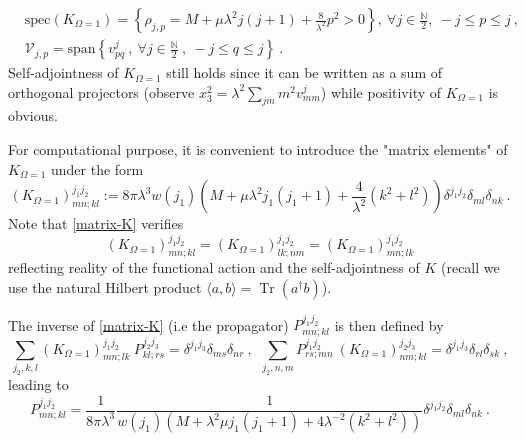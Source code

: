 \documentclass[a4paper,11pt,twoside]{article}
\numberwithin{equation}{section}
\DeclareMathOperator{\tr}{Tr}
\theoremstyle{nonumberplain}
\newcounter{and}
\begin{document}
%
\begin{eqnarray}
&\text{spec}(K_{\Omega=1}) = \left\{ \rho_{j,p} = M + \mu \lambda^2 j(j+1) + \frac{8}{\lambda^2} p^2>0 \right\},\ \forall j \in \frac{\mathbb{N}}{2} , \ -j \le p \le j \ , \label{spec-K}& \\[2pt]
&\mathcal{V}_{j,p} = \text{span}\left\{v^j_{pq} \ , \ \forall j \in \frac{\mathbb{N}}{2} \ , \ -j \le q \le j \right\} \ . \label{eigensp-K}&
\end{eqnarray}
%
Self-adjointness of $K_{\Omega=1}$ still holds since it can be written as a sum of orthogonal projectors (observe $x_3^2 = \lambda^2 \sum_{jm} m^2 v^j_{mm}$) while positivity of $K_{\Omega=1}$ is obvious.\par%
%
For computational purpose, it is convenient to introduce the "matrix elements" of $K_{\Omega=1}$ under the form%
%
\begin{equation}
\left(K_{\Omega=1}\right)^{j_1 j_2}_{mn;kl} := 8\pi\lambda^3 w(j_1) \left( M + \mu \lambda^2 j_1 (j_1+1) + \frac{4}{\lambda^2} (k^2+l^2) \right) \delta^{j_1j_2} \delta_{ml} \delta_{nk} \ . \label{matrix-K} 
\end{equation}
%
Note that \eqref{matrix-K} verifies%
%
\begin{equation}
\left(K_{\Omega=1}\right)^{j_1j_2}_{mn;kl} = \left(K_{\Omega=1}\right)^{j_1j_2}_{lk;nm} = \left(K_{\Omega=1}\right)^{j_1j_2}_{mn;lk} \label{sym-K}
\end{equation}
%
reflecting reality of the functional action and the self-adjointness of $K$ (recall we use the natural Hilbert product $\langle a,b \rangle = \tr(a^\dag b)$).\par%
%
The inverse of \eqref{matrix-K} (i.e the propagator) $P^{j_1j_2}_{mn;kl}$ is then defined by%
%
\begin{equation}
\sum_{j_2,k,l} \left(K_{\Omega=1}\right)^{j_1j_2}_{mn;lk} \ P^{j_2j_3}_{kl;rs} = \delta^{j_1j_3} \delta_{ms} \delta_{nr} \ , \ \ \sum_{j_2,n,m} P^{j_1j_2}_{rs;mn} \ \left(K_{\Omega=1}\right)^{j_2j_3}_{nm;kl} = \delta^{j_1j_3} \delta_{rl} \delta_{sk} \ , \label{propagator-def}
\end{equation}
%
leading to%
%
\begin{equation}
P^{j_1j_2}_{mn;kl} = \frac{1}{8\pi\lambda^3} \frac{1}{w(j_1)\left(M+\lambda^2\mu j_1(j_1+1)+4\lambda^{-2}(k^2+l^2)\right)}\delta^{j_1j_2}\delta_{ml}\delta_{nk} \ .  \label{propagator}
\end{equation}

\end{document}
